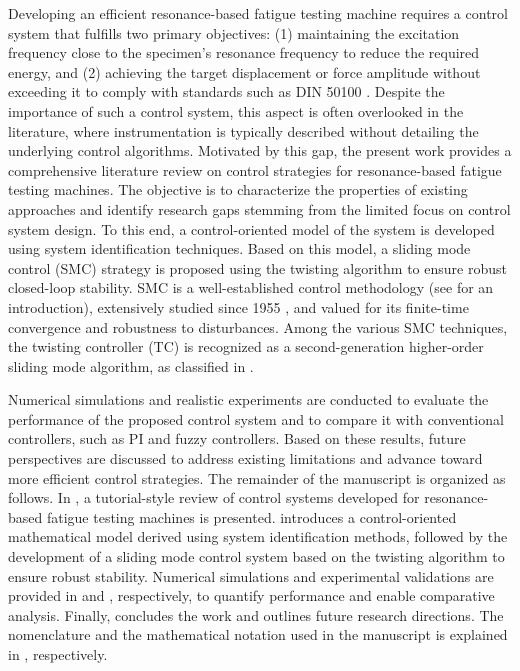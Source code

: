 \documentclass[preprint,12pt]{elsarticle}
\begin{document}
Developing an efficient resonance-based fatigue testing machine requires a control system that fulfills two primary objectives: (1) maintaining the excitation frequency close to the specimen’s resonance frequency to reduce the required energy, and (2) achieving the target displacement or force amplitude without exceeding it to comply with standards such as DIN 50100 \cite{DIN_standard}. Despite the importance of such a control system, this aspect is often overlooked in the literature, where instrumentation is typically described without detailing the underlying control algorithms. Motivated by this gap, the present work provides a comprehensive literature review on control strategies for resonance-based fatigue testing machines. The objective is to characterize the properties of existing approaches and identify research gaps stemming from the limited focus on control system design. To this end, a control-oriented model of the system is developed using system identification techniques. Based on this model, a sliding mode control (SMC) strategy is proposed using the twisting algorithm to ensure robust closed-loop stability. SMC is a well-established control methodology (see \cite{Slotine1991} for an introduction), extensively studied since 1955 \cite{Utkin1955}, and valued for its finite-time convergence and robustness to disturbances. Among the various SMC techniques, the twisting controller (TC) \cite{UTKIN2020_higher_order, Orlov_twisting, Utkin_twisting, POLYAKOV_twisting, Santiesteban_twisting, TORRESGONZALEZ2017_twisting, Santiesteban_twisting} is recognized as a second-generation higher-order sliding mode algorithm, as classified in \cite{Fridman2015}.


Numerical simulations and realistic experiments are conducted to evaluate the performance of the proposed control system and to compare it with conventional controllers, such as PI and fuzzy controllers. Based on these results, future perspectives are discussed to address existing limitations and advance toward more efficient control strategies. The remainder of the manuscript is organized as follows. In , a tutorial-style review of control systems developed for resonance-based fatigue testing machines is presented.  introduces a control-oriented mathematical model derived using system identification methods, followed by the development of a sliding mode control system based on the twisting algorithm to ensure robust stability. Numerical simulations and experimental validations are provided in  and , respectively, to quantify performance and enable comparative analysis. Finally,  concludes the work and outlines future research directions. The nomenclature and the mathematical notation used in the manuscript is explained in , respectively.
\end{document}
